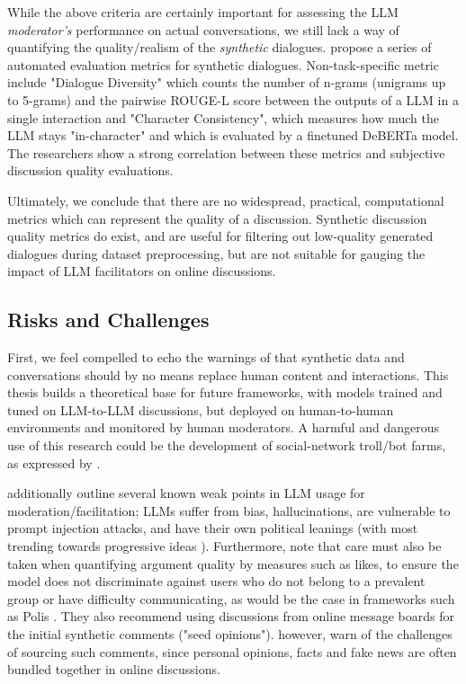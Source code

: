 While the above criteria are certainly important for assessing the LLM \textit{moderator's} performance on actual conversations, we still lack a way of quantifying the quality/realism of the \textit{synthetic} dialogues. \citet{ulmer2024bootstrappingllmbasedtaskorienteddialogue} propose a series of automated evaluation metrics for synthetic dialogues. Non-task-specific metric include "Dialogue Diversity" which counts the number of n-grams (unigrams up to 5-grams) and the pairwise ROUGE-L \cite{lin-2004-rouge} score between the outputs of a LLM in a single interaction and "Character Consistency", which measures how much the LLM stays "in-character" and which is evaluated by a finetuned DeBERTa \cite{he2023debertav3improvingdebertausing} model. The researchers show a strong correlation between these metrics and subjective discussion quality evaluations. 

Ultimately, we conclude that there are no widespread, practical, computational metrics which can represent the quality of a discussion. Synthetic discussion quality metrics do exist, and are useful for filtering out low-quality generated dialogues during dataset preprocessing, but are not suitable for gauging the impact of LLM facilitators on online discussions.


\subsection{Risks and Challenges}
\label{sec:related:challenges}

First, we feel compelled to echo the warnings of \citet{small-polis-llm} that synthetic data and conversations should by no means replace human content and interactions. This thesis builds a theoretical base for future frameworks, with models trained and tuned on LLM-to-LLM discussions, but deployed on human-to-human environments and monitored by human moderators. A harmful and dangerous use of this research could be the development of social-network troll/bot farms, as expressed by \citet{park2022socialsimulacracreatingpopulated}.

\citet{small-polis-llm} additionally outline several known weak points in LLM usage for moderation/facilitation; LLMs suffer from bias, hallucinations, are vulnerable to prompt injection attacks, and have their own political leanings (with most trending towards progressive ideas \cite{Taubenfeld2024SystematicBI}). Furthermore, \citet{vecchi-2021-towards} note that care must also be taken when quantifying argument quality by measures such as likes, to ensure the model does not discriminate against users who do not belong to a prevalent group or have difficulty communicating, as would be the case in frameworks such as Polis \cite{small2021polis}. They also recommend using discussions from online message boards for the initial synthetic comments ("seed opinions"). \citet{vecchi-2021-towards} however, warn of the challenges of sourcing such comments, since personal opinions, facts and fake news are often bundled together in online discussions.

